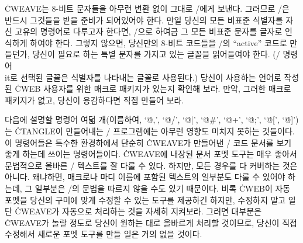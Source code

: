 \more
\.{CWEAVE}는 8-비트 문자들을 아무런 변환 없이 그대로 \TEX/에게 보낸다.
그러므로 \TEX/은 반드시 그것들을 받을 준비가 되어있어야 한다.
만일 당신의 모든 비표준 식별자를 자신 고유의 명령어로 다루고자 한다면,
\TEX/으로 하여금 그 모든 비표준 문자를 글자로 인식하게 하여야 한다.
그렇지 않으면, 당신만의 8-비트 코드들을 \TEX/의 ``active'' 코드로
만들던가, 당신이 필요로 하는 특별 문자를 가지고 있는 글꼴을 읽어들여야 한다.
(\TEX/ 명령어 \.{\\it}로 선택된 글꼴은 식별자를 나타내는 글꼴로
사용된다.) 당신이 사용하는 언어로 작성된 \.{CWEB} 사용자를 위한 매크로
패키지가 있는지 확인해 보라. 만약, 그러한 매크로 패키지가 없고, 당신이
용감하다면 직접 만들어 보라.

\subsec
다음에 설명할 명령어 여덟 개(이름하여, `\.{@,}', `\.{@/}', `\.{@|}', `\.{@\#}',
`\.{@+}', `\.{@;}', `\.{@[}', `\.{@]}')는 \.{CTANGLE}이 만들어내는
\CEE/ 프로그램에는 아무런 영향도 미치지 못하는 것들이다. 이 명령어들은
특수한 환경하에서 단순히 \.{CWEAVE}가 만들어낸 \CEE/ 코드 문서를 보기
좋게 하는데 쓰이는 명령어들이다.
\.{CWEAVE}에 내장된 문서 포멧 도구는 매우 좋아서 문법적으로 올바른
\CEE/ 텍스트를 잘 다룰 수 있다. 하지만, 모든 경우를 다 커버하는 것은
아니다. 왜냐하면, 매크로나 마디 이름에 포함된 텍스트의 일부분도 다룰 수
있어야 하는데, 그 일부분은 \CEE/의 문법을 따르지 않을 수도 있기 때문이다.
비록 \.{CWEB}이 자동 포멧을 당신의 구미에 맞게 수정할 수 있는 도구를
제공하긴 하지만, 수정하지 말고 일단 \.{CWEAVE}가 자동으로 처리하는
것을 자세히 지켜보라. 그러면 대부분은 \.{CWEAVE}가 놀랄 정도로
당신이 원하는 대로 올바르게 처리할 것이므로, 당신이 직접 수정해서
새로운 포멧 도구를 만들 일은 거의 없을 것이다.

